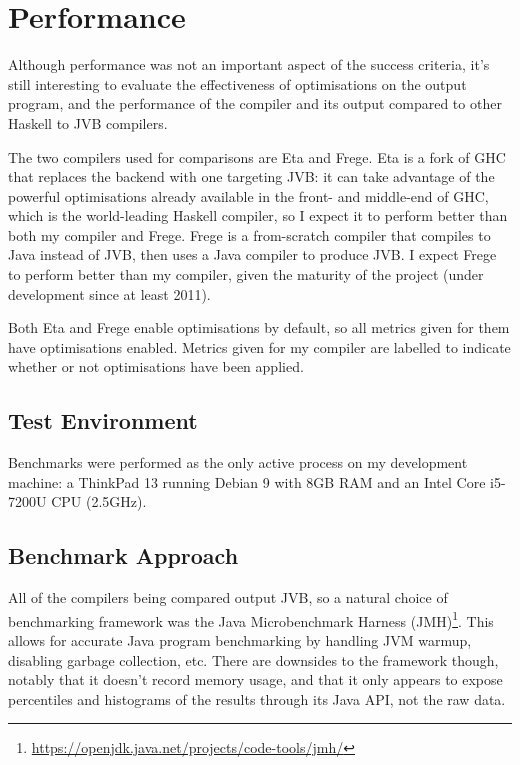 \documentclass[dissertation.tex]{subfiles}
\begin{document}
\section{Performance}
{

    Although performance was not an important aspect of the success criteria, it's still interesting to evaluate the
    effectiveness of optimisations on the output program, and the performance of the compiler and its output compared to
    other Haskell to JVB compilers.

    The two compilers used for comparisons are Eta and Frege. Eta is a fork of GHC that replaces the backend with one
    targeting JVB: it can take advantage of the powerful optimisations already available in the front- and middle-end of
    GHC, which is the world-leading Haskell compiler, so I expect it to perform better than both my compiler and Frege.
    Frege is a from-scratch compiler that compiles to Java instead of JVB, then uses a Java compiler to produce JVB. I
    expect Frege to perform better than my compiler, given the maturity of the project (under development since at least
    2011).

    Both Eta and Frege enable optimisations by default, so all metrics given for them have optimisations enabled.
    Metrics given for my compiler are labelled to indicate whether or not optimisations have been applied.

    \subsection{Test Environment}\label{sec:test-environment}
    {

        Benchmarks were performed as the only active process on my development machine: a ThinkPad 13 running Debian 9
        with 8GB RAM and an Intel Core i5-7200U CPU (2.5GHz).

    }
    \subsection{Benchmark Approach}
    {

        All of the compilers being compared output JVB, so a natural choice of benchmarking framework was the Java
        Microbenchmark Harness (JMH)\footnote{\url{https://openjdk.java.net/projects/code-tools/jmh/}}. This allows for
        accurate Java program benchmarking by handling JVM warmup, disabling garbage collection, etc. There are
        downsides to the framework though, notably that it doesn't record memory usage, and that it only appears to
        expose percentiles and histograms of the results through its Java API, not the raw data.

}}
\end{document}
